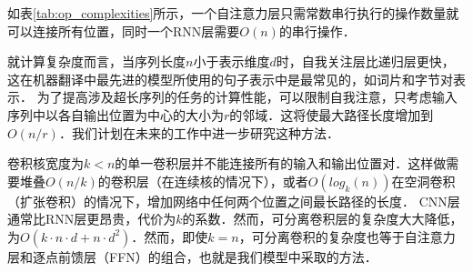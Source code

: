 如表\ref{tab:op_complexities}所示，一个自注意力层只需常数串行执行的操作数量就可以连接所有位置，同时一个RNN层需要$O(n)$的串行操作．


就计算复杂度而言，当序列长度$n$小于表示维度$d$时，自我关注层比递归层更快，这在机器翻译中最先进的模型所使用的句子表示中是最常见的，如词片\citep{wu2016google}和字节对\citep{sennrich2015neural}表示．
为了提高涉及超长序列的任务的计算性能，可以限制自我注意，只考虑输入序列中以各自输出位置为中心的大小为$r$的邻域．这将使最大路径长度增加到$O(n/r)$．我们计划在未来的工作中进一步研究这种方法．


卷积核宽度为$k<n$的单一卷积层并不能连接所有的输入和输出位置对．这样做需要堆叠$O(n/k)$的卷积层（在连续核的情况下），或者$O(log_k(n))$在空洞卷积（扩张卷积）\citep{NalBytenet2017}的情况下，增加网络中任何两个位置之间最长路径的长度．
CNN层通常比RNN层更昂贵，代价为$k$的系数．然而，可分离卷积层的复杂度大大降低，为$O(k\cdot n\cdot d + n\cdot d^2)$．然而，即使$k=n$，可分离卷积的复杂度也等于自注意力层和逐点前馈层（FFN）的组合，也就是我们模型中采取的方法．

